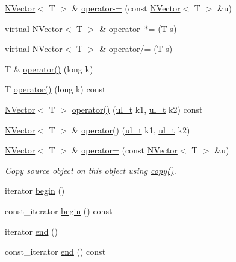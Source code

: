 \begin{DoxyCompactItemize}
\item 
\mbox{\hyperlink{class_n_vector}{N\+Vector}}$<$ T $>$ \& \mbox{\hyperlink{class_n_vector_af402cb6a52bf52d08286cfa8edb6afaa}{operator-\/=}} (const \mbox{\hyperlink{class_n_vector}{N\+Vector}}$<$ T $>$ \&u)
\item 
virtual \mbox{\hyperlink{class_n_vector}{N\+Vector}}$<$ T $>$ \& \mbox{\hyperlink{class_n_vector_a1630b8394837cf1ddf808f2761136771}{operator $\ast$=}} (T s)
\item 
virtual \mbox{\hyperlink{class_n_vector}{N\+Vector}}$<$ T $>$ \& \mbox{\hyperlink{class_n_vector_ac6dc40f82bad305c159643de675e7395}{operator/=}} (T s)
\item 
T \& \mbox{\hyperlink{class_n_vector_a3ed21b63fd97af9c63bfacb372f733a5}{operator()}} (long k)
\item 
T \mbox{\hyperlink{class_n_vector_a51d4a2c505c1434f45e8f80d1d77eda5}{operator()}} (long k) const
\item 
\mbox{\hyperlink{class_n_vector}{N\+Vector}}$<$ T $>$ \mbox{\hyperlink{class_n_vector_a8778fdc3c0a27a7930fda3f2a7155e96}{operator()}} (\mbox{\hyperlink{typedef_8h_a1b140a2034db3f5dfe18a987745df43a}{ul\+\_\+t}} k1, \mbox{\hyperlink{typedef_8h_a1b140a2034db3f5dfe18a987745df43a}{ul\+\_\+t}} k2) const
\item 
\mbox{\hyperlink{class_n_vector}{N\+Vector}}$<$ T $>$ \& \mbox{\hyperlink{class_n_vector_a98f95a46c34ceaf355e86e9dad9863e1}{operator()}} (\mbox{\hyperlink{typedef_8h_a1b140a2034db3f5dfe18a987745df43a}{ul\+\_\+t}} k1, \mbox{\hyperlink{typedef_8h_a1b140a2034db3f5dfe18a987745df43a}{ul\+\_\+t}} k2)
\item 
\mbox{\hyperlink{class_n_vector}{N\+Vector}}$<$ T $>$ \& \mbox{\hyperlink{class_n_vector_ab793bf6d3d3fc05f91f435c1c0a8e5ea}{operator=}} (const \mbox{\hyperlink{class_n_vector}{N\+Vector}}$<$ T $>$ \&u)
\begin{DoxyCompactList}\small\item\em Copy source object on this object using \mbox{\hyperlink{class_n_vector_a67128d2ff536b8ccd7a95cb680bd0431}{copy()}}. \end{DoxyCompactList}\item 
iterator \mbox{\hyperlink{class_n_vector_ae71ea78f955c0512a1dd005c335f956a}{begin}} ()
\item 
const\+\_\+iterator \mbox{\hyperlink{class_n_vector_a39aa7aecfd17e2db8130f5fbc956bb8f}{begin}} () const
\item 
iterator \mbox{\hyperlink{class_n_vector_a11675cb00213e89ae5a563f59d0f4ff3}{end}} ()
\item 
const\+\_\+iterator \mbox{\hyperlink{class_n_vector_ac019e1018e5d0dd8113d2f2605aa2987}{end}} () const
\end{DoxyCompactItemize}
